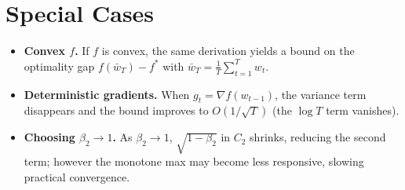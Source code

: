 \documentclass{article}
\begin{document}
\section*{Special Cases}
\begin{itemize}
\item \textbf{Convex $f$.} If $f$ is convex, the same derivation yields a bound on the optimality gap $f(\bar w_T)-f^*$ with $\bar w_T=\frac{1}{T}\sum_{t=1}^{T}w_t$.
\item \textbf{Deterministic gradients.} When $g_t=\nabla f(w_{t-1})$, the variance term disappears and the bound improves to $O(1/\sqrt{T})$ (the $\log T$ term vanishes).
\item \textbf{Choosing $\beta_2\to1$.} As $\beta_2\to1$, $\sqrt{1-\beta_2}$ in $C_2$ shrinks, reducing the second term; however the monotone max may become less responsive, slowing practical convergence.
\end{itemize}
\end{document}
